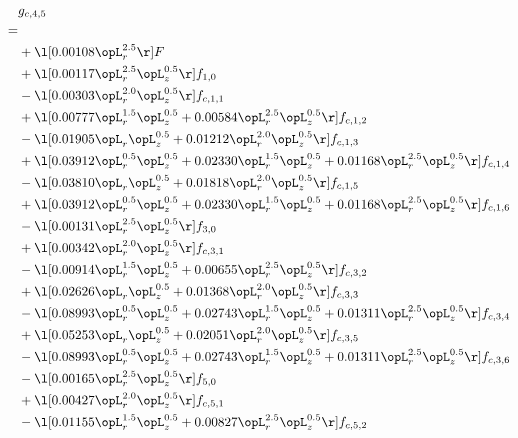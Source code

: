 \begin{alignat}{2} 
\label{eq:g_45_0} 
& g_{c,4,5} \nonumber \\ 
 = \\ 
& + \l[  0.00108 \opL_r^{2.5}  \r] F \nonumber \\ 
& + \l[  0.00117 \opL_r^{2.5} \opL_z^{0.5}  \r] f_{1,0} \nonumber \\ 
& - \l[  0.00303 \opL_r^{2.0} \opL_z^{0.5}  \r] f_{c,1,1} \nonumber \\ 
& + \l[  0.00777 \opL_r^{1.5} \opL_z^{0.5} +  0.00584 \opL_r^{2.5} \opL_z^{0.5}  \r] f_{c,1,2} \nonumber \\ 
& - \l[  0.01905 \opL_r \opL_z^{0.5} +  0.01212 \opL_r^{2.0} \opL_z^{0.5}  \r] f_{c,1,3} \nonumber \\ 
& + \l[  0.03912 \opL_r^{0.5} \opL_z^{0.5} +  0.02330 \opL_r^{1.5} \opL_z^{0.5} +  0.01168 \opL_r^{2.5} \opL_z^{0.5}  \r] f_{c,1,4} \nonumber \\ 
& - \l[  0.03810 \opL_r \opL_z^{0.5} +  0.01818 \opL_r^{2.0} \opL_z^{0.5}  \r] f_{c,1,5} \nonumber \\ 
& + \l[  0.03912 \opL_r^{0.5} \opL_z^{0.5} +  0.02330 \opL_r^{1.5} \opL_z^{0.5} +  0.01168 \opL_r^{2.5} \opL_z^{0.5}  \r] f_{c,1,6} \nonumber \\ 
& - \l[  0.00131 \opL_r^{2.5} \opL_z^{0.5}  \r] f_{3,0} \nonumber \\ 
& + \l[  0.00342 \opL_r^{2.0} \opL_z^{0.5}  \r] f_{c,3,1} \nonumber \\ 
& - \l[  0.00914 \opL_r^{1.5} \opL_z^{0.5} +  0.00655 \opL_r^{2.5} \opL_z^{0.5}  \r] f_{c,3,2} \nonumber \\ 
& + \l[  0.02626 \opL_r \opL_z^{0.5} +  0.01368 \opL_r^{2.0} \opL_z^{0.5}  \r] f_{c,3,3} \nonumber \\ 
& - \l[  0.08993 \opL_r^{0.5} \opL_z^{0.5} +  0.02743 \opL_r^{1.5} \opL_z^{0.5} +  0.01311 \opL_r^{2.5} \opL_z^{0.5}  \r] f_{c,3,4} \nonumber \\ 
& + \l[  0.05253 \opL_r \opL_z^{0.5} +  0.02051 \opL_r^{2.0} \opL_z^{0.5}  \r] f_{c,3,5} \nonumber \\ 
& - \l[  0.08993 \opL_r^{0.5} \opL_z^{0.5} +  0.02743 \opL_r^{1.5} \opL_z^{0.5} +  0.01311 \opL_r^{2.5} \opL_z^{0.5}  \r] f_{c,3,6} \nonumber \\ 
& - \l[  0.00165 \opL_r^{2.5} \opL_z^{0.5}  \r] f_{5,0} \nonumber \\ 
& + \l[  0.00427 \opL_r^{2.0} \opL_z^{0.5}  \r] f_{c,5,1} \nonumber \\ 
& - \l[  0.01155 \opL_r^{1.5} \opL_z^{0.5} +  0.00827 \opL_r^{2.5} \opL_z^{0.5}  \r] f_{c,5,2} \nonumber \\ 

\end{alignat}
